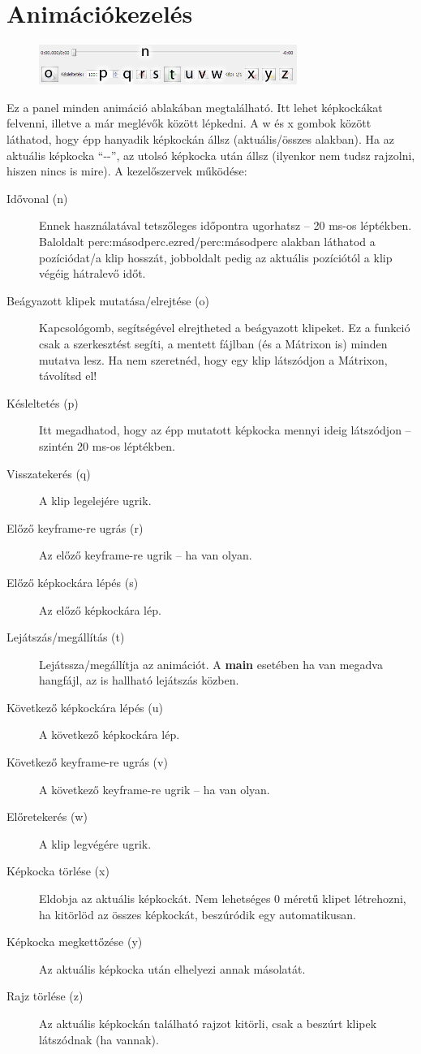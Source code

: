 \documentclass[a4paper,12pt,release]{article}
\begin{document}
\section{Animációkezelés}
\begin{figure}
	\vspace{-27pt}
	\begin{center}
		\includegraphics[width=0.75\textwidth]{pics/timeline.png}
	\end{center}
	\vspace{-27pt}
\end{figure}
Ez a panel minden animáció ablakában megtalálható. Itt lehet képkockákat felvenni, illetve a már meglévők között lépkedni. A w és x gombok között láthatod, hogy épp hanyadik képkockán állsz (aktuális/összes alakban). Ha az aktuális képkocka ``-{}-'', az utolsó képkocka után állsz (ilyenkor nem tudsz rajzolni, hiszen nincs is mire). A kezelőszervek működése:
\begin{description}
\item[Idővonal (n)]Ennek használatával tetszőleges időpontra ugorhatsz -- 20 ms-os léptékben. Baloldalt perc:másodperc.ezred/perc:másodperc alakban láthatod a pozíciódat/a klip hosszát, jobboldalt pedig az aktuális pozíciótól a klip végéig hátralevő időt.
\item[Beágyazott klipek mutatása/elrejtése (o)]Kapcsológomb, segítségével elrejtheted a beágyazott klipeket. Ez a funkció csak a szerkesztést segíti, a mentett fájlban (és a Mátrixon is) minden mutatva lesz. Ha nem szeretnéd, hogy egy klip látszódjon a Mátrixon, távolítsd el!
\item[Késleltetés (p)]Itt megadhatod, hogy az épp mutatott képkocka mennyi ideig látszódjon -- szintén 20 ms-os léptékben.
\item[Visszatekerés (q)]A klip legelejére ugrik.
\item[Előző keyframe-re ugrás (r)]Az előző keyframe-re ugrik -- ha van olyan.
\item[Előző képkockára lépés (s)]Az előző képkockára lép.
\item[Lejátszás/megállítás (t)]Lejátssza/megállítja az animációt. A {\bf main} esetében ha van megadva hangfájl, az is hallható lejátszás közben.
\item[Következő képkockára lépés (u)]A következő képkockára lép.
\item[Következő keyframe-re ugrás (v)]A következő keyframe-re ugrik -- ha van olyan.
\item[Előretekerés (w)]A klip legvégére ugrik.
\item[Képkocka törlése (x)]Eldobja az aktuális képkockát. Nem lehetséges 0 méretű klipet létrehozni, ha kitörlöd az összes képkockát, beszúródik egy automatikusan.
\item[Képkocka megkettőzése (y)]Az aktuális képkocka után elhelyezi annak másolatát.
\item[Rajz törlése (z)]Az aktuális képkockán található rajzot kitörli, csak a beszúrt klipek látszódnak (ha vannak).
\end{description}
\end{document}
